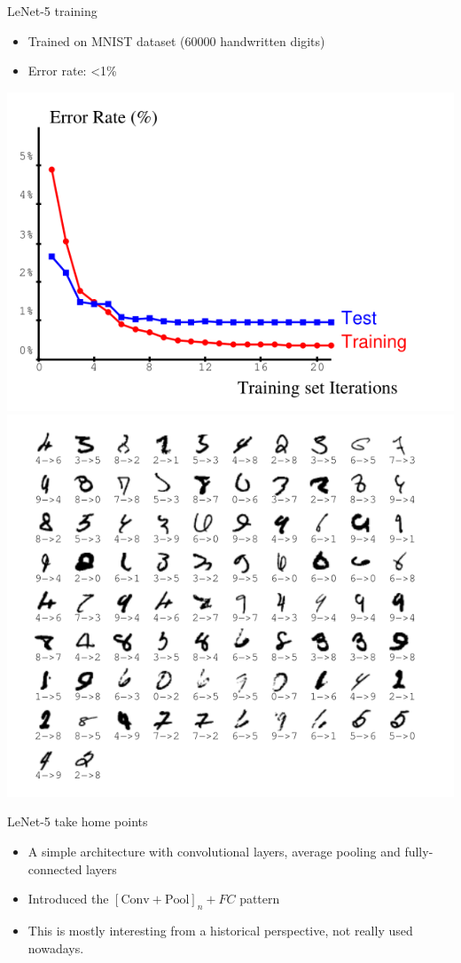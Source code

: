 \documentclass[9pt, aspectratio=169]{beamer}
\begin{document}
\begin{frame}
    {LeNet-5 training}

    \begin{itemize}
        \item Trained on MNIST dataset (60000 handwritten digits)
        \item Error rate: <1\%
    \end{itemize}

    \centering
    \includegraphics[width=.4\textwidth]{lenet5_training.png}
    \includegraphics[width=.4\textwidth]{lenet5_missclassification.png}
\end{frame}

\begin{frame}
    {LeNet-5 take home points}
    \begin{itemize}
        \item A simple architecture with convolutional layers, average pooling and fully-connected layers
        \item Introduced the $[\text{Conv}+\text{Pool}]_n + FC$ pattern
        \item This is mostly interesting from a historical perspective, not really used nowadays.
    \end{itemize}
\end{frame}
\end{document}
